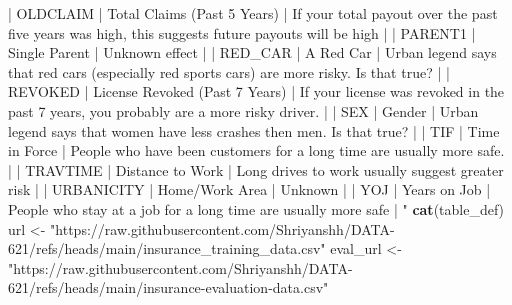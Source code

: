 \documentclass[
]{article}
\newenvironment{Shaded}{\begin{snugshade}}{\end{snugshade}}
\newcommand{\FunctionTok}[1]{\textcolor[rgb]{0.13,0.29,0.53}{\textbf{#1}}}
\newcommand{\NormalTok}[1]{#1}
\newcommand{\OtherTok}[1]{\textcolor[rgb]{0.56,0.35,0.01}{#1}}
\newcommand{\StringTok}[1]{\textcolor[rgb]{0.31,0.60,0.02}{#1}}
\begin{document}
\begin{Shaded}
\begin{Highlighting}[]
\StringTok{| \textasciigrave{}OLDCLAIM\textasciigrave{}       | Total Claims (Past 5 Years)              | If your total payout over the past five years was high, this suggests future payouts will be high | }
\StringTok{| \textasciigrave{}PARENT1\textasciigrave{}        | Single Parent                            | Unknown effect                                                                                    |}
\StringTok{| \textasciigrave{}RED\_CAR\textasciigrave{}        | A Red Car                                | Urban legend says that red cars (especially red sports cars) are more risky. Is that true?        |}
\StringTok{| \textasciigrave{}REVOKED\textasciigrave{}        | License Revoked (Past 7 Years)           | If your license was revoked in the past 7 years, you probably are a more risky driver.            |}
\StringTok{| \textasciigrave{}SEX\textasciigrave{}            | Gender                                   | Urban legend says that women have less crashes then men. Is that true?                            | }
\StringTok{| \textasciigrave{}TIF\textasciigrave{}            | Time in Force                            | People who have been customers for a long time are usually more safe.                             |}
\StringTok{| \textasciigrave{}TRAVTIME\textasciigrave{}       | Distance to Work                         | Long drives to work usually suggest greater risk                                                  |}
\StringTok{| \textasciigrave{}URBANICITY\textasciigrave{}     | Home/Work Area                           | Unknown                                                                                           |}
\StringTok{| \textasciigrave{}YOJ\textasciigrave{}            | Years on Job                             | People who stay at a job for a long time are usually more safe                                    |}
\StringTok{"}
\FunctionTok{cat}\NormalTok{(table\_def)}
\NormalTok{url }\OtherTok{\textless{}{-}} \StringTok{"https://raw.githubusercontent.com/Shriyanshh/DATA{-}621/refs/heads/main/insurance\_training\_data.csv"}
\NormalTok{eval\_url }\OtherTok{\textless{}{-}} \StringTok{"https://raw.githubusercontent.com/Shriyanshh/DATA{-}621/refs/heads/main/insurance{-}evaluation{-}data.csv"}


\end{Highlighting}
\end{Shaded}
\end{document}

